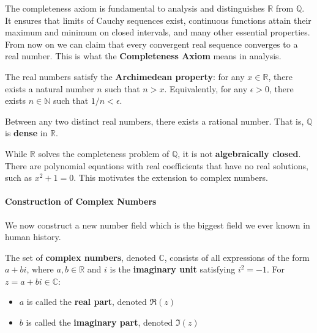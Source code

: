 \documentclass[oneside]{book}
\begin{document}
The completeness axiom is fundamental to analysis and distinguishes $\mathbb{R}$ from $\mathbb{Q}$. It ensures that limits of Cauchy sequences exist, continuous functions attain their maximum and minimum on closed intervals, and many other essential properties. From now on we can claim that every convergent real sequence converges to a real number. This is what the \textbf{Completeness Axiom} means in analysis.

\begin{definition}
The real numbers satisfy the \textbf{Archimedean property}: for any $x \in \mathbb{R}$, there exists a natural number $n$ such that $n > x$. Equivalently, for any $\epsilon > 0$, there exists $n \in \mathbb{N}$ such that $1/n < \epsilon$.
\end{definition}

\begin{theorem}
Between any two distinct real numbers, there exists a rational number. That is, $\mathbb{Q}$ is \textbf{dense} in $\mathbb{R}$.
\end{theorem}

While $\mathbb{R}$ solves the completeness problem of $\mathbb{Q}$, it is not \textbf{algebraically closed}. There are polynomial equations with real coefficients that have no real solutions, such as $x^2 + 1 = 0$. This motivates the extension to complex numbers.

\newpage

\paragraph{Construction of Complex Numbers}

We now construct a new number field which is the biggest field we ever known in human history.

\begin{definition}
The set of \textbf{complex numbers}, denoted $\mathbb{C}$, consists of all expressions of the form $a + bi$, where $a, b \in \mathbb{R}$ and $i$ is the \textbf{imaginary unit} satisfying $i^2 = -1$. For $z = a + bi \in \mathbb{C}$:
\begin{itemize}
    \item $a$ is called the \textbf{real part}, denoted $\Re(z)$
    \item $b$ is called the \textbf{imaginary part}, denoted $\Im(z)$
\end{itemize}
\end{definition}
\end{document}
